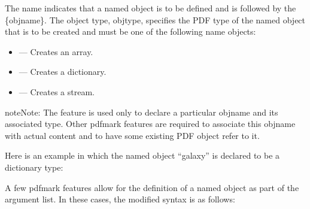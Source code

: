 \documentclass[letterpaper,12pt,english,openany,oneside]{sphinxmanual}
\begin{document}
\begin{sphinxVerbatim}[commandchars=\\\{\}]
\PYG{p}{[}  
 
 
\end{sphinxVerbatim}

The name  indicates that a named object is to be defined and is followed by the \{objname\}. The object type, objtype, specifies the PDF type of the named object that is to be created and must be one of the following name objects:
\begin{itemize}
\item {} 
 — Creates an array.

\item {} 
 — Creates a dictionary.

\item {} 
 — Creates a stream.

\end{itemize}

\begin{sphinxadmonition}{note}{Note:}
The feature  is used only to declare a particular objname and its associated type. Other pdfmark features are required to associate this objname with actual content and to have some existing PDF object refer to it.
\end{sphinxadmonition}

Here is an example in which the named object “galaxy” is declared to be a dictionary type:

\begin{sphinxVerbatim}[commandchars=\\\{\}]
\PYG{p}{[}      
\end{sphinxVerbatim}

A few pdfmark features allow for the definition of a named object as part of the argument list. In these cases, the modified syntax is as follows:

\begin{sphinxVerbatim}[commandchars=\\\{\}]
 \PYG{p}{[}  


  


\end{sphinxVerbatim}
\end{document}
